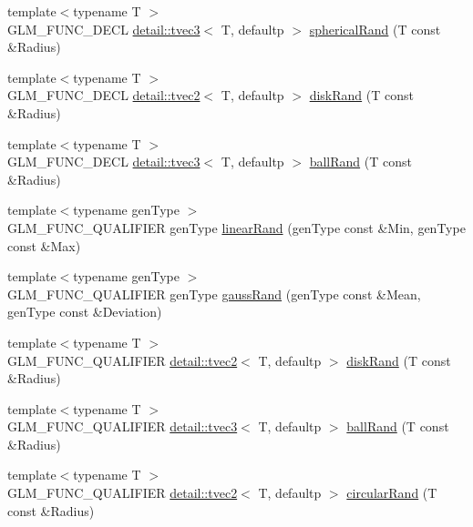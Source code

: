 \begin{DoxyCompactItemize}
{\footnotesize template$<$typename T $>$ }\\G\+L\+M\+\_\+\+F\+U\+N\+C\+\_\+\+D\+E\+CL \hyperlink{structglm_1_1detail_1_1tvec3}{detail\+::tvec3}$<$ T, defaultp $>$ \hyperlink{group__gtc__random_ga8a9eee1fcb08690881ead242fe4259dc}{spherical\+Rand} (T const \&Radius)
\item 
{\footnotesize template$<$typename T $>$ }\\G\+L\+M\+\_\+\+F\+U\+N\+C\+\_\+\+D\+E\+CL \hyperlink{structglm_1_1detail_1_1tvec2}{detail\+::tvec2}$<$ T, defaultp $>$ \hyperlink{group__gtc__random_ga7d24fc3ef13fd7b6cad7e7b870b0e322}{disk\+Rand} (T const \&Radius)
\item 
{\footnotesize template$<$typename T $>$ }\\G\+L\+M\+\_\+\+F\+U\+N\+C\+\_\+\+D\+E\+CL \hyperlink{structglm_1_1detail_1_1tvec3}{detail\+::tvec3}$<$ T, defaultp $>$ \hyperlink{group__gtc__random_gac9c6e44b013874c291547f568d240500}{ball\+Rand} (T const \&Radius)
\item 
{\footnotesize template$<$typename gen\+Type $>$ }\\G\+L\+M\+\_\+\+F\+U\+N\+C\+\_\+\+Q\+U\+A\+L\+I\+F\+I\+ER gen\+Type \hyperlink{group__gtc__random_ga310c2e65883e62a4405128f187f41f27}{linear\+Rand} (gen\+Type const \&Min, gen\+Type const \&Max)
\item 
{\footnotesize template$<$typename gen\+Type $>$ }\\G\+L\+M\+\_\+\+F\+U\+N\+C\+\_\+\+Q\+U\+A\+L\+I\+F\+I\+ER gen\+Type \hyperlink{group__gtc__random_gacba09f5b8e1e8eac3d318ae6426bbd26}{gauss\+Rand} (gen\+Type const \&Mean, gen\+Type const \&Deviation)
\item 
{\footnotesize template$<$typename T $>$ }\\G\+L\+M\+\_\+\+F\+U\+N\+C\+\_\+\+Q\+U\+A\+L\+I\+F\+I\+ER \hyperlink{structglm_1_1detail_1_1tvec2}{detail\+::tvec2}$<$ T, defaultp $>$ \hyperlink{group__gtc__random_ga7d24fc3ef13fd7b6cad7e7b870b0e322}{disk\+Rand} (T const \&Radius)
\item 
{\footnotesize template$<$typename T $>$ }\\G\+L\+M\+\_\+\+F\+U\+N\+C\+\_\+\+Q\+U\+A\+L\+I\+F\+I\+ER \hyperlink{structglm_1_1detail_1_1tvec3}{detail\+::tvec3}$<$ T, defaultp $>$ \hyperlink{group__gtc__random_gac9c6e44b013874c291547f568d240500}{ball\+Rand} (T const \&Radius)
\item 
{\footnotesize template$<$typename T $>$ }\\G\+L\+M\+\_\+\+F\+U\+N\+C\+\_\+\+Q\+U\+A\+L\+I\+F\+I\+ER \hyperlink{structglm_1_1detail_1_1tvec2}{detail\+::tvec2}$<$ T, defaultp $>$ \hyperlink{group__gtc__random_gac1ab03c2c797ce352fd74cdb5229b151}{circular\+Rand} (T const \&Radius)

\end{DoxyCompactItemize}
